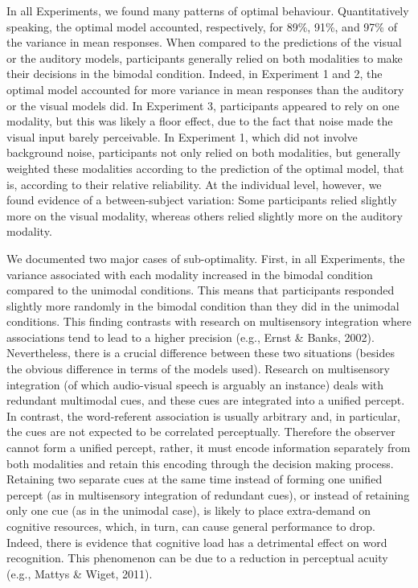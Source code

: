 \documentclass[english,floatsintext,man]{apa6}
\theoremstyle{definition}
\theoremstyle{definition}
\theoremstyle{definition}
\theoremstyle{remark}
\begin{document}
In all Experiments, we found many patterns of optimal behaviour.
Quantitatively speaking, the optimal model accounted, respectively, for
89\%, 91\%, and 97\% of the variance in mean responses. When compared to
the predictions of the visual or the auditory models, participants
generally relied on both modalities to make their decisions in the
bimodal condition. Indeed, in Experiment 1 and 2, the optimal model
accounted for more variance in mean responses than the auditory or the
visual models did. In Experiment 3, participants appeared to rely on one
modality, but this was likely a floor effect, due to the fact that noise
made the visual input barely perceivable. In Experiment 1, which did not
involve background noise, participants not only relied on both
modalities, but generally weighted these modalities according to the
prediction of the optimal model, that is, according to their relative
reliability. At the individual level, however, we found evidence of a
between-subject variation: Some participants relied slightly more on the
visual modality, whereas others relied slightly more on the auditory
modality.

We documented two major cases of sub-optimality. First, in all
Experiments, the variance associated with each modality increased in the
bimodal condition compared to the unimodal conditions. This means that
participants responded slightly more randomly in the bimodal condition
than they did in the unimodal conditions. This finding contrasts with
research on multisensory integration where associations tend to lead to
a higher precision (e.g., Ernst \& Banks, 2002). Nevertheless, there is
a crucial difference between these two situations (besides the obvious
difference in terms of the models used). Research on multisensory
integration (of which audio-visual speech is arguably an instance) deals
with redundant multimodal cues, and these cues are integrated into a
unified percept. In contrast, the word-referent association is usually
arbitrary and, in particular, the cues are not expected to be correlated
perceptually. Therefore the observer cannot form a unified percept,
rather, it must encode information separately from both modalities and
retain this encoding through the decision making process. Retaining two
separate cues at the same time instead of forming one unified percept
(as in multisensory integration of redundant cues), or instead of
retaining only one cue (as in the unimodal case), is likely to place
extra-demand on cognitive resources, which, in turn, can cause general
performance to drop. Indeed, there is evidence that cognitive load has a
detrimental effect on word recognition. This phenomenon can be due to a
reduction in perceptual acuity (e.g., Mattys \& Wiget, 2011).
\end{document}
